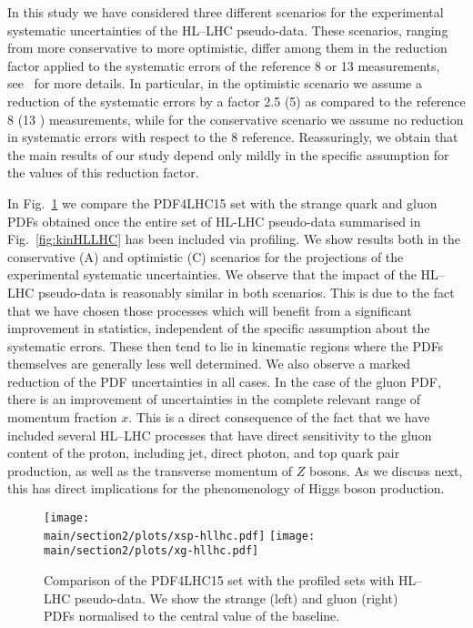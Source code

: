 In this study we have considered three
different scenarios for the
experimental systematic uncertainties of the HL--LHC pseudo-data.
    These scenarios, ranging from more conservative to more optimistic, differ among them in
    the reduction factor
    applied to the systematic errors of the reference
    8 \UTeV or 13 \UTeV measurements, see~\cite{Khalek:2018mdn}
    for more details.
    In particular, in the optimistic scenario we assume a reduction
    of the systematic errors by a factor 2.5 (5) as compared to the
    reference 8 \UTeV (13 \UTeV) measurements, while for
    the conservative scenario we assume no reduction in systematic
    errors with respect to the 8 \UTeV reference.
    Reassuringly, we obtain that the main results of our
    study depend only mildly in the specific assumption for
    the values of this reduction factor.

    In Fig.~\ref{fig:PDFratios}  we compare the PDF4LHC15 set
    with the strange quark and gluon PDFs obtained once the entire
    set of HL-LHC pseudo-data summarised in Fig.~\ref{fig:kinHLLHC}
    has been included via profiling.
    We show results both in the conservative (A) and optimistic (C) scenarios
    for the projections of the experimental systematic uncertainties.
    We observe that the
  impact of the HL--LHC pseudo-data is reasonably similar
  in both scenarios.
  This is due to the fact that we have chosen
  those processes which will benefit from a significant improvement in statistics, independent of the specific assumption about the systematic errors. These then tend to lie in kinematic regions where the PDFs themselves are generally less
  well determined.
  We also observe
  a marked reduction of the PDF uncertainties in all cases.
  In the case of the gluon PDF, there is an improvement of
  uncertainties in the complete relevant range of momentum
  fraction $x$.
  This is a direct consequence of the fact that
  we have included several HL--LHC processes
  that have direct sensitivity to the gluon
  content of the proton, including jet, direct photon, and top quark pair
  production, as well as the transverse momentum of $Z$ bosons.
  As we discuss next, this has direct implications for the phenomenology of Higgs
  boson production.
      
\begin{figure}[t]
  \begin{center}
    \texttt{[image: \\main/section2/plots/xsp-hllhc.pdf]}
\texttt{[image: \\main/section2/plots/xg-hllhc.pdf]}
\caption{\small Comparison of the PDF4LHC15 set with the profiled sets
  with HL--LHC pseudo-data.
  We show the strange (left) and gluon (right) PDFs
  normalised to the central value of
  the baseline.
     \label{fig:PDFratios} }
  \end{center}
\end{figure}

